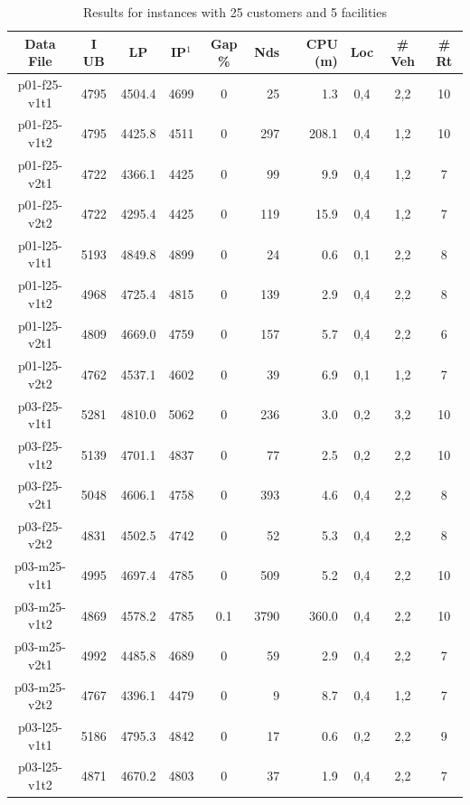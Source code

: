 \begin{table}[!htbp]
\centering
\caption{Results for instances with 25 customers and 5 facilities}\label{25Cust_res}
\begin {tabular}[!h]{|c|c|c|c|c|r|r|c|c|c|}
\hline
Data File & I UB & LP & IP$^1$ & Gap \% & Nds & CPU (m) & Loc & \# Veh & \# Rt \\ \hline
p01-f25-v1t1 &  4795 &  4504.4 & 4699   & 0 & 25    & 1.3   & 0,4   & 2,2   & 10 \\
p01-f25-v1t2 &  4795 &  4425.8 & 4511   & 0 & 297   & 208.1 & 0,4   & 1,2   & 10 \\
p01-f25-v2t1 &  4722 &  4366.1 & 4425   & 0 & 99    & 9.9   & 0,4   & 1,2   & 7 \\
p01-f25-v2t2 &  4722 &  4295.4 & 4425   & 0 & 119   & 15.9  & 0,4   & 1,2   & 7 \\\hline
p01-l25-v1t1 &  5193 &  4849.8 & 4899   & 0 & 24    & 0.6   & 0,1   & 2,2   & 8 \\
p01-l25-v1t2 &  4968 &  4725.4 & 4815   & 0 & 139   & 2.9   & 0,4   & 2,2   & 8 \\
p01-l25-v2t1 &  4809 &  4669.0 & 4759   & 0 & 157   & 5.7   & 0,4   & 2,2   & 6 \\
p01-l25-v2t2 &  4762 &  4537.1 & 4602   & 0 & 39    & 6.9   & 0,1   & 1,2   & 7 \\\hline
p03-f25-v1t1 &  5281 &  4810.0 & 5062   & 0 & 236   & 3.0   & 0,2   & 3,2   & 10 \\
p03-f25-v1t2 &  5139 &  4701.1 & 4837   & 0 & 77    & 2.5   & 0,2   & 2,2   & 10 \\
p03-f25-v2t1 &  5048 &  4606.1 & 4758   & 0 & 393   & 4.6   & 0,4   & 2,2   & 8 \\
p03-f25-v2t2 &  4831 &  4502.5 & 4742   & 0 & 52    & 5.3   & 0,4   & 2,2   & 8 \\\hline
p03-m25-v1t1 &  4995 &  4697.4 & 4785   & 0 & 509   & 5.2   & 0,4   & 2,2   & 10 \\
p03-m25-v1t2 &  4869 &  4578.2 & 4785   & 0.1 & 3790    & 360.0 & 0,4   & 2,2   & 10 \\
p03-m25-v2t1 &  4992 &  4485.8 & 4689   & 0 & 59    & 2.9   & 0,4   & 2,2   & 7 \\
p03-m25-v2t2 &  4767 &  4396.1 & 4479   & 0 & 9         & 8.7   & 0,4   & 1,2   & 7 \\\hline
p03-l25-v1t1 &  5186 &  4795.3 & 4842   & 0 & 17    & 0.6   & 0,2   & 2,2   & 9 \\
p03-l25-v1t2 &  4871 &  4670.2 & 4803   & 0 & 37    & 1.9   & 0,4   & 2,2   & 7 \\

\end{tabular}
\end{table}
